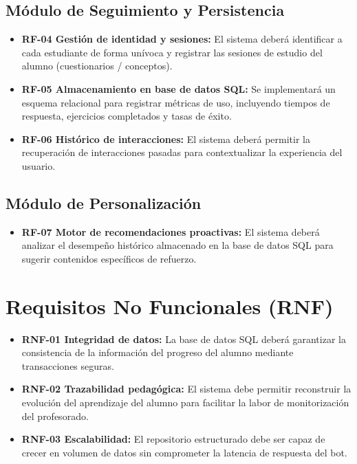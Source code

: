 \documentclass[a4paper,12pt,twoside,final]{book}
\begin{document}
\subsection{Módulo de Seguimiento y Persistencia}
\begin{itemize}
    \item \textbf{RF-04 Gestión de identidad y sesiones:} El sistema deberá identificar a cada estudiante de forma unívoca y registrar las sesiones de estudio del alumno (cuestionarios / conceptos).
    \item \textbf{RF-05 Almacenamiento en base de datos SQL:} Se implementará un esquema relacional para registrar métricas de uso, incluyendo tiempos de respuesta, ejercicios completados y tasas de éxito.
    \item \textbf{RF-06 Histórico de interacciones:} El sistema deberá permitir la recuperación de interacciones pasadas para contextualizar la experiencia del usuario.
\end{itemize}

\subsection{Módulo de Personalización}
\begin{itemize}
    \item \textbf{RF-07 Motor de recomendaciones proactivas:} El sistema deberá analizar el desempeño histórico almacenado en la base de datos SQL para sugerir contenidos específicos de refuerzo.
\end{itemize}

\section{Requisitos No Funcionales (RNF)}
\begin{itemize}
    \item \textbf{RNF-01 Integridad de datos:} La base de datos SQL deberá garantizar la consistencia de la información del progreso del alumno mediante transacciones seguras.
    \item \textbf{RNF-02 Trazabilidad pedagógica:} El sistema debe permitir reconstruir la evolución del aprendizaje del alumno para facilitar la labor de monitorización del profesorado.
    \item \textbf{RNF-03 Escalabilidad:} El repositorio estructurado debe ser capaz de crecer en volumen de datos sin comprometer la latencia de respuesta del bot.
\end{itemize}
\end{document}
